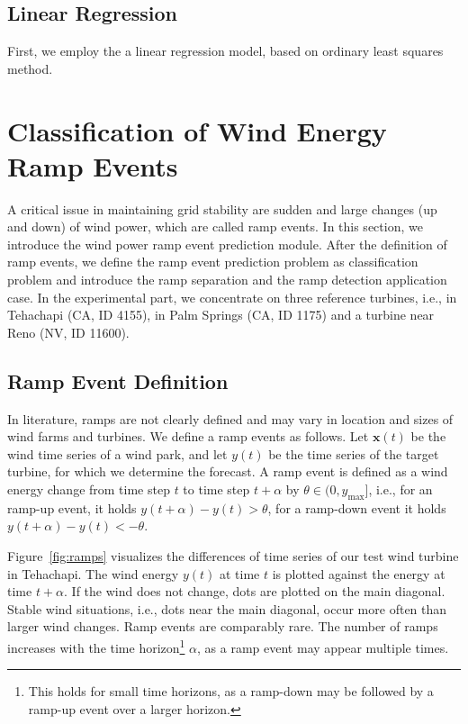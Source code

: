 \documentclass[10pt, conference, compsocconf]{IEEEtran}
\begin{document}
\subsection{Linear Regression}
First, we employ the a linear regression model, based on ordinary least squares method. 



\section{Classification of Wind Energy Ramp Events}
\label{sec:ramps}

A critical issue in maintaining grid stability are sudden and large changes (up and down) of wind power, which are called ramp events. In this section, we introduce the wind power ramp event prediction module. After the definition of ramp events, we define the ramp event prediction problem as classification problem and introduce the ramp separation and the ramp detection application case. In the experimental part, we concentrate on three reference turbines, i.e., in Tehachapi (CA, ID 4155), in Palm Springs (CA, ID 1175) and a turbine near Reno (NV, ID 11600).


\subsection{Ramp Event Definition}

In literature, ramps are not clearly defined \cite{kamath,focken} and may vary in location and sizes of wind farms and turbines. We define a ramp events as follows. Let $\mathbf{x}(t)$ be the wind time series of a wind park, and let $y(t)$ be the time series of the target turbine, for which we determine the forecast. A ramp event is defined as a wind energy change from time step $t$ to time step $t+\alpha$ by $\theta \in (0, y_{\max}]$, i.e., for an ramp-up event, it holds $y(t+\alpha) - y(t)>\theta$, for a ramp-down event it holds $y(t+\alpha) - y(t)<-\theta$. 

Figure~\ref{fig:ramps} visualizes the differences of time series of our test wind turbine in Tehachapi. The wind energy $y(t)$ at time $t$ is plotted against the energy at time $t+\alpha$. If the wind does not change, dots are plotted on the main diagonal. Stable wind situations, i.e., dots near the main diagonal, occur more often than larger wind changes. Ramp events are comparably rare. The number of ramps increases with the time horizon\footnote{This holds for small time horizons, as a ramp-down may be followed by a ramp-up event over a larger horizon.} $\alpha$, as a ramp event may appear multiple times.
\end{document}
